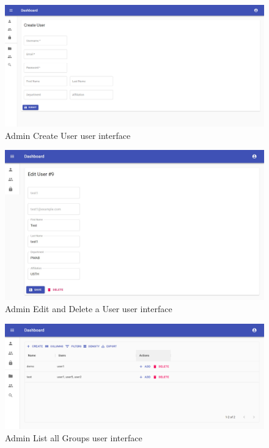 \begin{figure}[H]
    \centering
    \includegraphics[width=1.0\textwidth]{images/Admin-Create-User.png}
    \caption{Admin Create User user interface}
    \label{fig:adminCreateUser}
\end{figure}
\begin{figure}[H]
    \centering
    \includegraphics[width=1.0\textwidth]{images/Admin-Edit-User.jpg}
    \caption{Admin Edit and Delete a User user interface}
    \label{fig:adminEditDeleteUser}
\end{figure}
\begin{figure}[H]
    \centering
    \includegraphics[width=1.0\textwidth]{images/Group-List-Admin.png}
    \caption{Admin List all Groups user interface}
    \label{fig:adminListAllGroups}
\end{figure}
